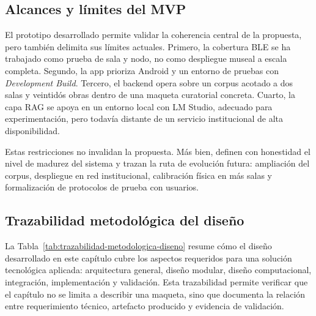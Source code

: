 \subsection{Alcances y límites del MVP}

El prototipo desarrollado permite validar la coherencia central de la propuesta, pero también delimita sus límites actuales. Primero, la cobertura BLE se ha trabajado como prueba de sala y nodo, no como despliegue museal a escala completa. Segundo, la app prioriza Android y un entorno de pruebas con \textit{Development Build}. Tercero, el backend opera sobre un corpus acotado a dos salas y veintidós obras dentro de una maqueta curatorial concreta. Cuarto, la capa RAG se apoya en un entorno local con LM Studio, adecuado para experimentación, pero todavía distante de un servicio institucional de alta disponibilidad.

Estas restricciones no invalidan la propuesta. Más bien, definen con honestidad el nivel de madurez del sistema y trazan la ruta de evolución futura: ampliación del corpus, despliegue en red institucional, calibración física en más salas y formalización de protocolos de prueba con usuarios.

\subsection{Trazabilidad metodológica del diseño}

La Tabla~\ref{tab:trazabilidad-metodologica-diseno} resume cómo el diseño desarrollado en este capítulo cubre los aspectos requeridos para una solución tecnológica aplicada: arquitectura general, diseño modular, diseño computacional, integración, implementación y validación. Esta trazabilidad permite verificar que el capítulo no se limita a describir una maqueta, sino que documenta la relación entre requerimiento técnico, artefacto producido y evidencia de validación.

